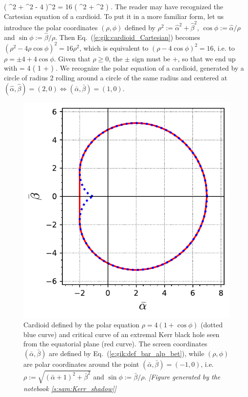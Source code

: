 \be \label{e:gik:cardioid_Cartesian}
   \left( \hat{\alpha}^2 + \hat{\beta}^2  - 4 \hat{\alpha} \right)^2 =
    16 \left(  \hat{\alpha}^2 + \hat{\beta}^2 \right) .
\ee
The reader may have recognized the Cartesian equation of a cardioid. To put it
in a more familiar form, let us introduce the polar coordinates $(\rho,\phi)$
defined by $\rho^2 := \hat{\alpha}^2 + \hat{\beta}^2$, $\cos\phi := \hat{\alpha}/\rho$
and $\sin\phi := \hat{\beta}/\rho$.
Then Eq.~(\ref{e:gik:cardioid_Cartesian}) becomes
$(\rho^2 - 4 \rho\cos\phi )^2 = 16 \rho^2$,
which is equivalent to $(\rho - 4\cos\phi)^2 = 16$, i.e.
to $\rho = \pm 4 + 4\cos\phi$.
Given that $\rho \geq 0$, the $\pm$ sign must be $+$, so that we end up with
\be
    \rho = 4 \left( 1 + \cos\phi \right) .
\ee
We recognize the polar equation of a cardioid, generated by a circle of radius 2 rolling around a
circle of the same radius and centered at $(\hat{\alpha},\hat{\beta}) = (2,0) \iff
(\bar{\alpha},\bar{\beta}) = (1, 0)$.

\begin{figure}
\centerline{
\includegraphics[height=0.28\textheight]{gik_shadow_cardioid.pdf} }
\caption[]{\label{f:gik:shadow_cardioid} \footnotesize
Cardioid defined by the polar equation $\rho = 4 \left( 1 + \cos\phi \right)$ (dotted blue curve)
and critical curve of an extremal Kerr black hole seen from the equatorial
plane (red curve). The screen coordinates $(\bar{\alpha},\bar{\beta})$ are
defined by Eq.~(\ref{e:gik:def_bar_alp_bet}), while $(\rho,\phi)$ are polar
coordinates around the point $(\bar{\alpha},\bar{\beta})=(-1,0)$, i.e.
$\rho := \sqrt{(\bar{\alpha}+1)^2 + \bar{\beta}^2}$ and $\sin\phi := \bar{\beta}/\rho$.
\textsl{[Figure generated by the notebook \ref{s:sam:Kerr_shadow}]}
}
\end{figure}

